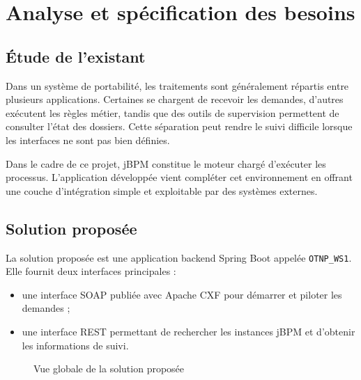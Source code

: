 \documentclass[12pt,a4paper]{report}
\begin{document}
\chapter{Analyse et spécification des besoins}
\section{Étude de l'existant}
Dans un système de portabilité, les traitements sont généralement répartis entre plusieurs applications. Certaines se chargent de recevoir les demandes, d'autres exécutent les règles métier, tandis que des outils de supervision permettent de consulter l'état des dossiers. Cette séparation peut rendre le suivi difficile lorsque les interfaces ne sont pas bien définies.

Dans le cadre de ce projet, jBPM constitue le moteur chargé d'exécuter les processus. L'application développée vient compléter cet environnement en offrant une couche d'intégration simple et exploitable par des systèmes externes.

\section{Solution proposée}
La solution proposée est une application backend Spring Boot appelée \texttt{OTNP\_WS1}. Elle fournit deux interfaces principales :
\begin{itemize}
    \item une interface SOAP publiée avec Apache CXF pour démarrer et piloter les demandes ;
    \item une interface REST permettant de rechercher les instances jBPM et d'obtenir les informations de suivi.
\end{itemize}

\begin{figure}[h]
    \centering
    \caption{Vue globale de la solution proposée}
\end{figure}
\end{document}
